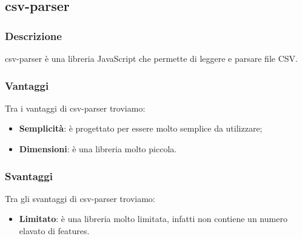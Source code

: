 \subsection*{csv-parser}

\subsubsection*{Descrizione}
csv-parser è una libreria JavaScript che permette di leggere e parsare file CSV.

\subsubsection*{Vantaggi}
Tra i vantaggi di csv-parser troviamo:
\begin{itemize}
    \item \textbf{Semplicità}: è progettato per essere molto semplice da utilizzare;
    \item \textbf{Dimensioni}: è una libreria molto piccola.
\end{itemize}

\subsubsection*{Svantaggi}
Tra gli svantaggi di csv-parser troviamo:
\begin{itemize}
    \item \textbf{Limitato}: è una libreria molto limitata, infatti non contiene un numero elavato di features.
\end{itemize}


